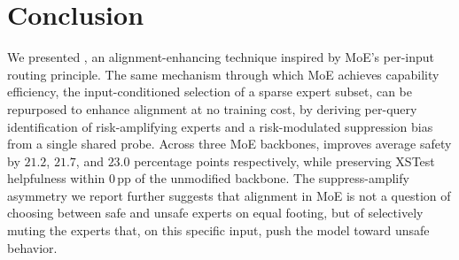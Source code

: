 \section{Conclusion}
We presented \name{}, an alignment-enhancing technique inspired by MoE's per-input routing principle. The same mechanism through which MoE achieves capability efficiency, the input-conditioned selection of a sparse expert subset, can be repurposed to enhance alignment at no training cost, by deriving per-query identification of risk-amplifying experts and a risk-modulated suppression bias from a single shared probe. Across three MoE backbones, \name{} improves average safety by $21.2$, $21.7$, and $23.0$ percentage points respectively, while preserving XSTest helpfulness within $0$\,pp of the unmodified backbone. The suppress-amplify asymmetry we report further suggests that alignment in MoE is not a question of choosing between safe and unsafe experts on equal footing, but of selectively muting the experts that, on this specific input, push the model toward unsafe behavior.




